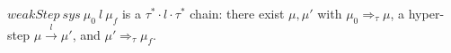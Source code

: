 \begin{definition}
  \label{def:weakstep}
  \leanok
  $weakStep\ sys\ \mu_0\ l\ \mu_f$ is a $\tau^\ast\!\cdot l\cdot\tau^\ast$ chain: there exist $\mu, \mu'$ with $\mu_0 \Rightarrow_\tau \mu$, a hyper-step $\mu \xrightarrow{l} \mu'$, and $\mu' \Rightarrow_\tau \mu_f$.
\end{definition}
